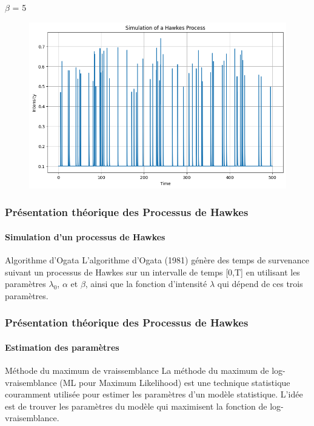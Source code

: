 \begin{frame}
    \begin{block}{$\beta$ = 5}
    \begin{figure}[h]
        \centering
        \includegraphics[width=0.6\linewidth]{figures/beta3.png}
    \end{figure}
    \end{block}
\end{frame}

\begin{frame}
    \frametitle{Présentation théorique des Processus de Hawkes}
    \framesubtitle{Simulation d'un processus de Hawkes}

    \begin{block}{Algorithme d'Ogata}
        L'algorithme d'Ogata (1981) génère des temps de survenance suivant un processus de Hawkes sur un intervalle de temps [0,T] en utilisant les paramètres $\lambda_0$, $\alpha$ et $\beta$, ainsi que la fonction d'intensité $\lambda$ qui dépend de ces trois paramètres.
    \end{block}
\end{frame}


\begin{frame}
    \frametitle{Présentation théorique des Processus de Hawkes}
    \framesubtitle{Estimation des paramètres}

    \begin{block}{Méthode du maximum de vraissemblance}
    La méthode du maximum de log-vraisemblance (ML pour Maximum Likelihood) est une technique statistique couramment utilisée pour estimer les paramètres d'un modèle statistique. L'idée est de trouver les paramètres du modèle qui maximisent la fonction de log-vraisemblance.

    \end{block}
\end{frame}

